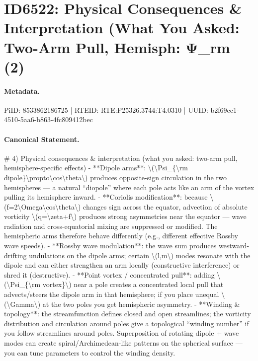 \section*{ID6522: Physical Consequences \& Interpretation (What You Asked: Two-Arm Pull, Hemisph: Ψ\_rm (2)}
\paragraph{Metadata.}
PiID: 8533862186725 | RTEID: RTE:P25326.3744:T4.0310 | UUID: b2f69cc1-4510-5aa6-b863-4fc809412bec

\paragraph{Canonical Statement.}
\# 4) Physical consequences \& interpretation (what you asked: two-arm pull, hemisphere-specific effects) - **Dipole arms**: \textbackslash{}(\textbackslash{}Psi\_\{\textbackslash{}rm dipole\}\textbackslash{}propto\textbackslash{}cos\textbackslash{}theta\textbackslash{}) produces opposite-sign circulation in the two hemispheres — a natural “diopole” where each pole acts like an arm of the vortex pulling its hemisphere inward. - **Coriolis modification**: because \textbackslash{}(f=2\textbackslash{}Omega\textbackslash{}cos\textbackslash{}theta\textbackslash{}) changes sign across the equator, advection of absolute vorticity \textbackslash{}(q=\textbackslash{}zeta+f\textbackslash{}) produces strong asymmetries near the equator — wave radiation and cross-equatorial mixing are suppressed or modified. The hemispheric arms therefore behave differently (e.g., different effective Rossby wave speeds). - **Rossby wave modulation**: the wave sum produces westward-drifting undulations on the dipole arms; certain \textbackslash{}(l,m\textbackslash{}) modes resonate with the dipole and can either strengthen an arm locally (constructive interference) or shred it (destructive). - **Point vortex / concentrated pull**: adding \textbackslash{}(\textbackslash{}Psi\_\{\textbackslash{}rm vortex\}\textbackslash{}) near a pole creates a concentrated local pull that advects/steers the dipole arm in that hemisphere; if you place unequal \textbackslash{}(\textbackslash{}Gamma\textbackslash{}) at the two poles you get hemispheric asymmetry. - **Winding \& topology**: the streamfunction defines closed and open streamlines; the vorticity distribution and circulation around poles give a topological “winding number” if you follow streamlines around poles. Superposition of rotating dipole + wave modes can create spiral/Archimedean-like patterns on the spherical surface — you can tune parameters to control the winding density.

